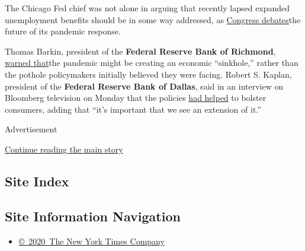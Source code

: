 The Chicago Fed chief was not alone in arguing that recently lapsed
expanded unemployment benefits should be in some way addressed, as
\href{https://www.nytimes3xbfgragh.onion/2020/08/02/us/politics/coronavirus-jobless-aid.html}{Congress
debates}the future of its pandemic response.

Thomas Barkin, president of the \textbf{Federal Reserve Bank of
Richmond},
\href{https://www.reuters.com/article/usa-fed-barkin/feds-barkin-says-economy-faces-sinkhole-without-more-fiscal-support-idUSW1N2B8003}{warned
that}the pandemic might be creating an economic ``sinkhole,'' rather
than the pothole policymakers initially believed they were facing.
Robert S. Kaplan, president of the \textbf{Federal Reserve Bank of
Dallas}, said in an interview on Bloomberg television on Monday that the
policies
\href{https://www.bloomberg.com/news/articles/2020-08-03/extension-of-jobless-benefits-to-buoy-growth-fed-s-kaplan-says?srnd=premium\&sref=oZtxD6sa}{had
helped} to bolster consumers, adding that ``it's important that we see
an extension of it.''

Advertisement

\protect\hyperlink{after-bottom}{Continue reading the main story}

\hypertarget{site-index}{%
\subsection{Site Index}\label{site-index}}

\hypertarget{site-information-navigation}{%
\subsection{Site Information
Navigation}\label{site-information-navigation}}

\begin{itemize}
\tightlist
\item
  \href{https://help.nytimes3xbfgragh.onion/hc/en-us/articles/115014792127-Copyright-notice}{©~2020~The
  New York Times Company}
\end{itemize}

